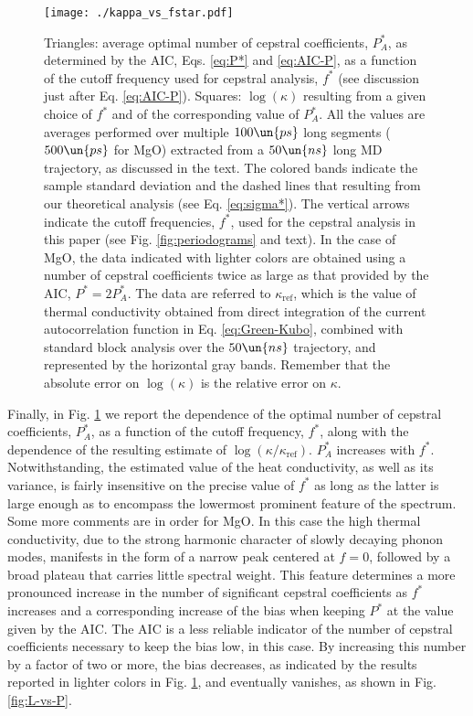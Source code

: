 \begin{figure}[!htb]
\centering
\texttt{[image: ./kappa\_vs\_fstar.pdf]}
\caption{Triangles: average optimal number of cepstral coefficients, $P_A^*$, as determined by the AIC, Eqs. \eqref{eq:P*} and \eqref{eq:AIC-P}, as a function of the cutoff frequency used for cepstral analysis, $f^*$ (see discussion just after Eq. \eqref{eq:AIC-P}). Squares: $\log(\kappa)$ resulting from a given choice of $f^*$ and of the corresponding value of $P_A^*$. All the values are averages performed over multiple $100\un{ps}$ long segments ($500\un{ps}$ for MgO) extracted from a $50\un{ns}$ long MD trajectory, as discussed in the text. The colored bands indicate the sample standard deviation and the dashed lines that resulting from our theoretical analysis (see Eq. \eqref{eq:sigma*}). The vertical arrows indicate the cutoff frequencies, $f^*$, used for the cepstral analysis in this paper (see Fig. \ref{fig:periodograms} and text). In the case of MgO, the data indicated with lighter colors are obtained using a number of cepstral coefficients twice as large as that provided by the AIC, $P^*=2P_A^*$. The data are referred to $\kappa_{\mathrm{ref}}$, which is the value of thermal conductivity obtained from direct integration of the current autocorrelation function in Eq. \eqref{eq:Green-Kubo}, combined with standard block analysis over the $50\un{ns}$ trajectory, and represented by the horizontal gray bands. Remember that the absolute error on $\log(\kappa)$ is the relative error on $\kappa$.
}
\label{fig:kappa_vs_fstar}
\end{figure}

Finally, in Fig. \ref{fig:kappa_vs_fstar} we report the dependence of the optimal number of cepstral coefficients, $P_A^*$, as a function of the cutoff frequency, $f^*$, along with the dependence of the resulting estimate of $\log(\kappa/\kappa_{\mathrm{ref}})$. $P_A^*$ increases with $f^*$. Notwithstanding, the estimated value of the heat conductivity, as well as its variance, is fairly insensitive on the precise value of $f^*$ as long as the latter is large enough as to encompass the lowermost prominent feature of the spectrum. Some more comments are in order for MgO. In this case the high thermal conductivity, due to the strong harmonic character of slowly decaying phonon modes, manifests in the form of a narrow peak centered at $f=0$, followed by a broad plateau that carries little spectral weight. This feature determines a more pronounced increase in the number of significant cepstral coefficients as $f^*$ increases and a corresponding increase of the bias when keeping $P^*$ at the value given by the AIC. The AIC is a less reliable indicator of the number of cepstral coefficients necessary to keep the bias low, in this case. By increasing this number by a factor of two or more, the bias decreases, as indicated by the results reported in lighter colors in Fig. \ref{fig:kappa_vs_fstar}, and eventually vanishes, as shown in Fig. \ref{fig:L-vs-P}.

